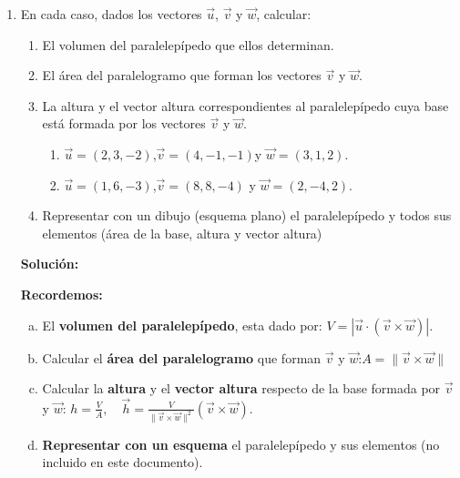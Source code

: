 \documentclass[11pt,a4paper]{article}
\begin{document}
\begin{enumerate}[\hspace{-5mm} 1) ]
\item  En cada caso, dados los vectores $\vec{u}$, $\vec{v}$ y $\vec{w}$, calcular:

\begin{enumerate}[ a)] 
    \item  El volumen del paralelepípedo que ellos determinan.
    \item  El área del paralelogramo que forman los vectores $\vec{v}$ y $\vec{w}$.
    \item  La altura y el vector altura correspondientes al paralelepípedo cuya base está formada por los vectores $\vec{v}$ y $\vec{w}$.
        \begin{enumerate}[ i)] 
            \item  $\vec{u} = (2, 3, -2)$,\quad $\vec{v} = (4, -1, -1)$\quad y \quad $\vec{w} = (3, 1, 2)$.

            
            \item  $\vec{u} = (1, 6, -3)$,\quad $\vec{v} = (8, 8, -4)$ \quad y \quad $\vec{w} = (2, -4, 2)$. 
        \end{enumerate}
    \item Representar con un dibujo (esquema plano) el paralelepípedo y todos sus elementos (área de la base, altura y
vector altura)
\end{enumerate}











\textbf{Solución:}

\textbf{Recordemos:}
\begin{enumerate}[a)]
    \item El \textbf{volumen del paralelepípedo}, esta dado por: \quad$V = |\vec{u} \cdot (\vec{v} \times \vec{w})|$.

    \item Calcular el \textbf{área del paralelogramo} que forman $\vec{v}$ y $\vec{w}$:\quad$ A = \|\vec{v} \times \vec{w}\|$ 

    \item Calcular la \textbf{altura} y el \textbf{vector altura} respecto de la base formada por $\vec{v}$ y $\vec{w}$: \quad $h = \frac{V}{A}, \quad \vec{h} = \frac{V}{\|\vec{v} \times \vec{w}\|^2} (\vec{v} \times \vec{w})$.

    \item \textbf{Representar con un esquema} el paralelepípedo y sus elementos (no incluido en este documento).
\end{enumerate}


\end{enumerate}
\end{document}
